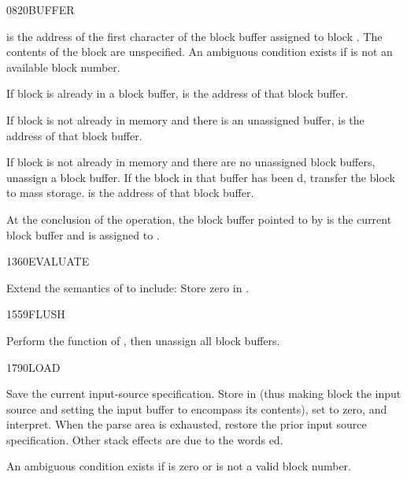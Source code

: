 \begin{worddef}{0820}{BUFFER}
\item {}

	 is the address of the first character of the
	block buffer assigned to block . The contents of the
	block are unspecified. An ambiguous condition exists if 
	is not an available block number.

	If block  is already in a block buffer, 
	is the address of that block buffer.

	If block  is not already in memory and there is an
	unassigned 	buffer,  is the address of that block
	buffer.

	If block  is not already in memory and there are no
	unassigned block buffers, unassign a block buffer. If the block
	in that buffer has been d, transfer the block to
	mass storage.  is the address of that block buffer.

	At the conclusion of the operation, the block buffer pointed to
	by  is the current block buffer and is assigned to
	.

\end{worddef}


\vspace*{-1ex}
\begin{worddef}{1360}{EVALUATE}
\item Extend the semantics of  to
	include: Store zero in .
\end{worddef}

\vspace*{-1ex}
\begin{worddef}{1559}{FLUSH}
\item \stack{}{}

	Perform the function of , then unassign all
	block buffers.
\end{worddef}

\vspace*{-1ex}\enlargethispage{6ex}
\begin{worddef}{1790}{LOAD}
\item {}

	Save the current input-source specification. Store  in
	 (thus making block  the input source and
	setting the input buffer to encompass its contents), set
	 to zero, and interpret. When the parse area is
	exhausted, restore the prior input source specification. Other
	stack effects are due to the words ed.

	An ambiguous condition exists if  is zero or is not a
	valid block number.

\end{worddef}


